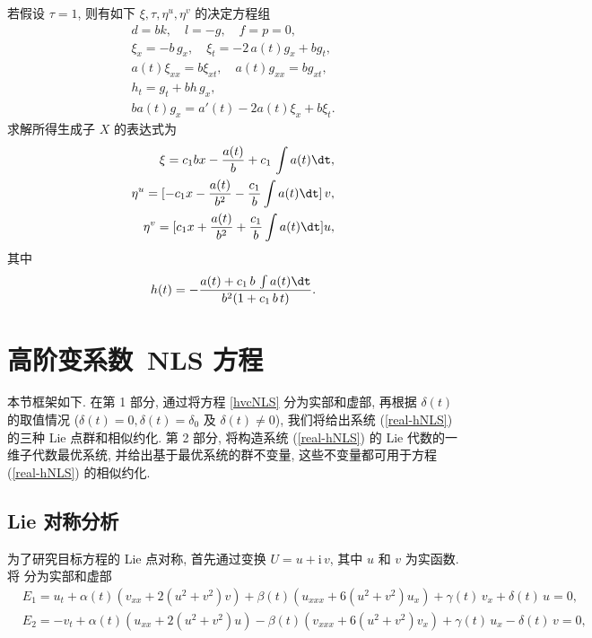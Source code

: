 若假设 $\tau=1$, 则有如下 $\xi, \tau, \eta^u, \eta^v$ 的决定方程组
\begin{align}
d=bk,\quad l=-g,\quad f=p=0,\\
\xi_x=-b\,g_x,\quad \xi_t=-2\,a(t)g_x+bg_t,\\
a(t)\xi_{xx}=b\xi_{xt},\quad a(t)g_{xx}=bg_{xt},\\
h_t=g_t+bh\,g_x,\\
ba(t)g_x=a'(t)-2a(t)\xi_x+b\xi_t.
\end{align}
求解所得生成子 $X$ 的表达式为
\begin{align}
\xi=c_1 b x-\frac{a(t)}{b}+c_1\,\int a(t)\dt,\\
\eta^u=[-c_1x-\frac{a(t)}{b^2}-\frac{c_1}{b}\int a(t)\dt]\,v,\\
\eta^v=[c_1x+\frac{a(t)}{b^2}+\frac{c_1}{b}\int a(t)\dt]u,
\end{align}
其中
\begin{equation*}
h(t)=-\frac{a(t)+c_1\,b\,\int a(t)\dt}{b^2(1+c_1\,b\,t)}.
\end{equation*}

\section{高阶变系数~NLS 方程}

本节框架如下. 在第 1 部分, 通过将方程 \eqref{hvcNLS} 分为实部和虚部, 再根据 $\delta(t)$ 的取值情况 ($\delta(t)=0, \delta(t)=\delta_0$ 及 $\delta(t)\neq 0$), 我们将给出系统 (\ref{real-hNLS}) 的三种 Lie 点群和相似约化.
第 2 部分, 将构造系统 (\ref{real-hNLS}) 的 Lie 代数的一维子代数最优系统, 并给出基于最优系统的群不变量, 这些不变量都可用于方程 (\ref{real-hNLS}) 的相似约化.

\subsection{Lie 对称分析}

为了研究目标方程的 Lie 点对称, 首先通过变换
$U=u+\text{i}\,v$, 其中 $u$ 和 $v$ 为实函数.
将  分为实部和虚部
\begin{equation}\label{real-hNLS}
\begin{aligned}
&E_1=u_t+\alpha(t) (v_{xx}+2(u^2+v^2)v)+\beta(t)(u_{xxx}+6(u^2+v^2)u_x) +\gamma(t)\,v_x+\delta(t)\,u=0,\\
&E_2=-v_t+\alpha(t)(u_{xx}+2(u^2+v^2)u)-\beta(t)(v_{xxx}+6(u^2+v^2)v_x) +\gamma(t)\,u_x-\delta(t)\,v=0,
\end{aligned}
\end{equation}


